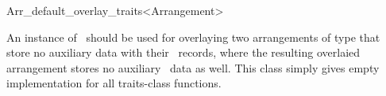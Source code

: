 
\ccRefPageBegin

\begin{ccRefClass}{Arr_default_overlay_traits<Arrangement>}

\ccDefinition

An instance of \ccRefName\ should be used for overlaying two arrangements
of type  that store no auxiliary data with their \dcel\
records, where the resulting overlaied arrangement stores no auxiliary
\dcel\ data as well. This class simply gives empty implementation for all
traits-class functions.


\ccIsModel

\ccSeeAlso

\end{ccRefClass}

\ccRefPageEnd

